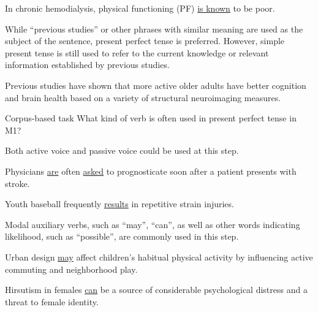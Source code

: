 \documentclass{ctexbook}
\begin{document}
    \begin{eg}[label={myautocounter}]{}
      In chronic hemodialysis, physical functioning (PF) \uline{is known} to be poor.
    \end{eg}

    While ``previous studies'' or other phrases with similar meaning are used as the subject of the sentence, present perfect tense is preferred. However, simple present tense is still used to refer to the current knowledge or relevant information established by previous studies.

    \begin{eg}[label={myautocounter}]{}
      Previous studies have shown that more active older adults have better cognition and brain health based on a variety of structural neuroimaging measures.
    \end{eg}

    \begin{task}[label={myautocounter}]{\heiti Corpus-based task}
      What kind of verb is often used in present perfect tense in M1?
    \end{task}

    Both active voice and passive voice could be used at this step.

    \begin{eg}[label={myautocounter}]{}
      Physicians \uline{are} often \uline{asked} to prognosticate soon after a patient presents with stroke.
    \end{eg}

    \begin{eg}[label={myautocounter}]{}
      Youth baseball frequently \uline{results} in repetitive strain injuries.
    \end{eg}

    Modal auxiliary verbs, such as ``may'', ``can'', as well as other words indicating likelihood, such as ``possible'', are commonly used in this step.

    \begin{eg}[label={myautocounter}]{}
      Urban design \uline{may} affect children's habitual physical activity by influencing active commuting and neighborhood play.
    \end{eg}

    \begin{eg}[label={myautocounter}]{}
      Hirsutism in females \uline{can} be a source of considerable psychological distress and a threat to female identity.
    \end{eg}
\end{document}
